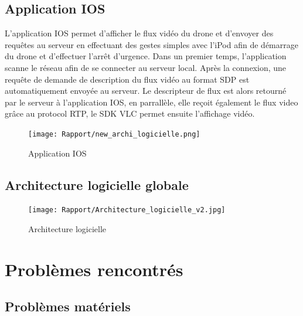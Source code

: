 \documentclass{article}
\begin{document}
     \subsection{Application IOS}
     L'application IOS permet d'afficher le flux vidéo du drone et d'envoyer des requêtes au serveur en effectuant des gestes simples avec l'iPod afin de démarrage du drone et d'effectuer l'arrêt d'urgence.
     \vspace{0.2cm}
     \newline
     Dans un premier temps, l'application scanne le réseau afin de se connecter au serveur local.
     Après la connexion, une requête de demande de description du flux vidéo au format SDP est automatiquement envoyée au serveur.
     \vspace{0.2cm}
     \newline
     Le descripteur de flux est alors retourné par le serveur à l'application IOS, en parrallèle, elle reçoit également le flux video grâce au protocol RTP, le SDK VLC permet ensuite l'affichage vidéo.
        \vspace*{0.3cm}
	    \begin{center}
		\begin{figure}[!h]
		\texttt{[image: Rapport/new\_archi\_logicielle.png]}\\
		\caption{Application IOS}
		\end{figure}
        \end{center}
        
    \newpage
	
	\subsection{Architecture logicielle globale}
	    \vspace*{0.3cm}
	    \begin{center}
		\begin{figure}[!h]
		\texttt{[image: Rapport/Architecture\_logicielle\_v2.jpg]}\\
		\caption{Architecture logicielle}
		\end{figure}
        \end{center}
		
\newpage
\section{Problèmes rencontrés}
	\subsection{Problèmes matériels}
	
\end{document}
